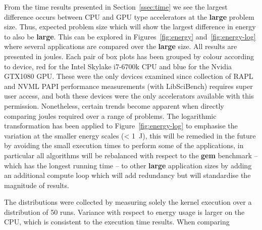 \documentclass[../document.tex]{subfiles}
\begin{document}

From the time results presented in Section~\ref{ssec:time} we see the largest difference occurs between CPU and GPU type accelerators at the {\bf large} problem size.
Thus, expected problem size which will show the largest difference in energy to also be {\bf large}.
This can be explored in Figures~\ref{fig:energy} and~\ref{fig:energy-log} where several applications are compared over the {\bf large} size.
All results are presented in joules.
Each pair of box plots has been grouped by colour according to device, red for the Intel Skylake i7-6700k CPU and blue for the Nvidia GTX1080 GPU.
These were the only devices examined since collection of RAPL and NVML PAPI performance measurements (with LibSciBench) requires super user access, and both these devices were the only accelerators available with this permission.
Nonetheless, certain trends become apparent when directly comparing joules required over a range of problems.
The logarithmic transformation has been applied to Figure~\ref{fig:energy-log} to emphasise the variation at the smaller energy scales (< \SI{1}{\joule}), this will be remedied in the future by avoiding the small execution times to perform some of the applications, in particular all algorithms will be rebalanced with respect to the {\bf gem} benchmark -- which has the longest running time -- to other {\bf large} application sizes by adding an additional compute loop which will add redundancy but will standardise the magnitude of results.

The distributions were collected by measuring solely the kernel execution over a distribution of 50 runs.
Variance with respect to energy usage is larger on the CPU, which is consistent to the execution time results.
When comparing 
\end{document}
